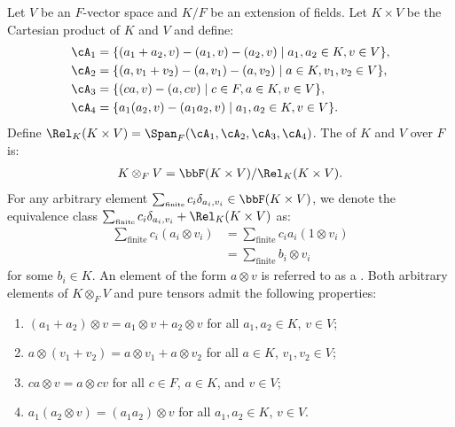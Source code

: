     \begin{definition}
        Let $V$ be an $F$-vector space and $K/F$ be an extension of fields. Let $K \times V$ be the Cartesian product of $K$ and $V$ and define:
            \begin{equation*}
            \begin{split}
                \cA_1 &= \{(a_1 + a_2,v)-(a_1,v)-(a_2,v) \mid a_1,a_2 \in K, v\in V\}, \\
                \cA_2 &= \{(a,v_1 + v_2) - (a,v_1) - (a,v_2) \mid a \in K, v_1,v_2 \in V\}, \\
                \cA_3 &= \{(ca,v) - (a,cv) \mid c \in F, a \in K, v\in V\}, \\
                \cA_4 &= \{a_1(a_2,v) - (a_1 a_2,v) \mid a_1,a_2 \in K,v \in V\}.
            \end{split}
            \end{equation*}
        Define $\Rel_K(K \times V) = \Span_F(\cA_1,\cA_2,\cA_3,\cA_4)$. The  of $K$ and $V$ over $F$ is:
            \begin{equation*}
            \begin{split}
                K \otimes_F V = \bbF(K \times V)/\Rel_K(K \times V).
            \end{split}
            \end{equation*}
        For any arbitrary element $\sum_{\text{\tiny finite}}c_i \delta_{a_i,v_i} \in \bbF(K \times V)$, we denote the equivalence class \newline $\sum_{\text{\tiny finite}}c_i \delta_{a_i,v_i} + \Rel_K(K \times V)$ as:
            \begin{equation*}
            \begin{split}
                \sum_{\text{finite}}c_i(a_i \otimes v_i)
                & = \sum_{\text{finite}}c_i a_i(1 \otimes v_i) \\
                & = \sum_{\text{finite}}b_i \otimes v_i
            \end{split}
            \end{equation*}
        for some $b_i \in K$. An element of the form $a \otimes v$ is referred to as a . Both arbitrary elements of $K \otimes_F V$ and pure tensors admit the following properties:
            \begin{enumerate}[label = (\arabic*)]
                \item $(a_1 + a_2) \otimes v = a_1 \otimes v + a_2 \otimes v$ for all $a_1,a_2 \in K$, $v \in V$;
                \item $a \otimes (v_1 + v_2) = a \otimes v_1 + a \otimes v_2$ for all $a \in K$, $v_1,v_2 \in V$;
                \item $ca \otimes v = a \otimes cv$ for all $c \in F$, $a \in K$, and $v \in V$;
                \item $a_1(a_2 \otimes v) = (a_1 a_2)\otimes v$ for all $a_1,a_2 \in K$, $v \in V$.
            \end{enumerate}
    \end{definition}

